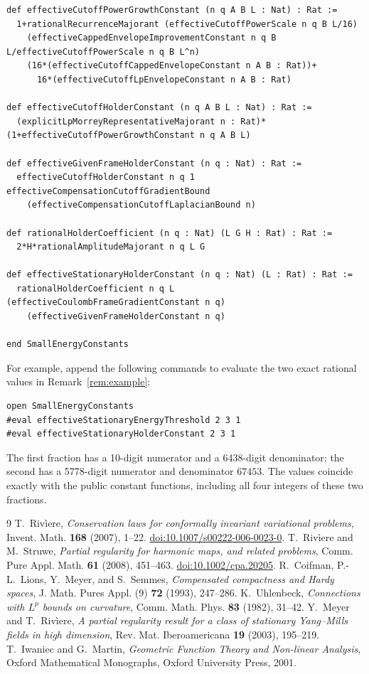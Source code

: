 \documentclass[reqno,11pt]{amsart}
\numberwithin{equation}{section}
\theoremstyle{definition}
\theoremstyle{remark}
\begin{document}
\begin{lstlisting}
def effectiveCutoffPowerGrowthConstant (n q A B L : Nat) : Rat :=
  1+rationalRecurrenceMajorant (effectiveCutoffPowerScale n q B L/16)
    (effectiveCappedEnvelopeImprovementConstant n q B L/effectiveCutoffPowerScale n q B L^n)
    (16*(effectiveCutoffCappedEnvelopeConstant n A B : Rat))+
      16*(effectiveCutoffLpEnvelopeConstant n A B : Rat)

def effectiveCutoffHolderConstant (n q A B L : Nat) : Rat :=
  (explicitLpMorreyRepresentativeMajorant n : Rat)*(1+effectiveCutoffPowerGrowthConstant n q A B L)

def effectiveGivenFrameHolderConstant (n q : Nat) : Rat :=
  effectiveCutoffHolderConstant n q 1 effectiveCompensationCutoffGradientBound
    (effectiveCompensationCutoffLaplacianBound n)

def rationalHolderCoefficient (n q : Nat) (L G H : Rat) : Rat :=
  2*H*rationalAmplitudeMajorant n q L G

def effectiveStationaryHolderConstant (n q : Nat) (L : Rat) : Rat :=
  rationalHolderCoefficient n q L (effectiveCoulombFrameGradientConstant n q)
    (effectiveGivenFrameHolderConstant n q)

end SmallEnergyConstants
\end{lstlisting}
For example, append the following commands to evaluate the two exact
rational values in Remark~\ref{rem:example}:
\begin{lstlisting}
open SmallEnergyConstants
#eval effectiveStationaryEnergyThreshold 2 3 1
#eval effectiveStationaryHolderConstant 2 3 1
\end{lstlisting}
The first fraction has a 10-digit numerator and a 6438-digit denominator;
the second has a 5778-digit numerator and denominator $67453$.
The values coincide exactly with the public constant functions, including
all four integers of these two fractions.

\begin{thebibliography}{9}
 T.~Riv\`iere,
\emph{Conservation laws for conformally invariant variational problems},
Invent. Math. \textbf{168} (2007), 1--22.
\href{https://doi.org/10.1007/s00222-006-0023-0}{doi:10.1007/s00222-006-0023-0}.
 T.~Riv\`iere and M.~Struwe,
\emph{Partial regularity for harmonic maps, and related problems},
Comm. Pure Appl. Math. \textbf{61} (2008), 451--463.
\href{https://doi.org/10.1002/cpa.20205}{doi:10.1002/cpa.20205}.
 R.~Coifman, P.-L.~Lions, Y.~Meyer, and S.~Semmes,
\emph{Compensated compactness and Hardy spaces},
J. Math. Pures Appl. (9) \textbf{72} (1993), 247--286.
 K.~Uhlenbeck,
\emph{Connections with $L^p$ bounds on curvature},
Comm. Math. Phys. \textbf{83} (1982), 31--42.
 Y.~Meyer and T.~Riv\`iere,
\emph{A partial regularity result for a class of stationary Yang--Mills
fields in high dimension}, Rev. Mat. Iberoamericana \textbf{19} (2003),
195--219.
 T.~Iwaniec and G.~Martin,
\emph{Geometric Function Theory and Non-linear Analysis},
Oxford Mathematical Monographs, Oxford University Press, 2001.
\end{thebibliography}
\end{document}
